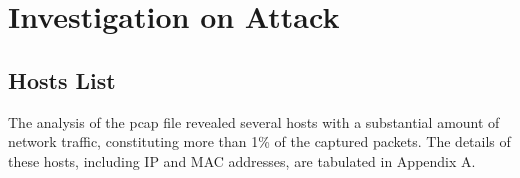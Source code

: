 \documentclass{article}
\begin{document}

    \section{\fontsize{14pt}{17pt}\selectfont Investigation on Attack}\label{sec:selectfont-investigation-on-attack}
    \subsection{Hosts List}\label{subsec:hosts-list}
    The analysis of the pcap file revealed several hosts with a substantial amount of network traffic,
    constituting more than 1\% of the captured packets.
    The details of these hosts, including IP and MAC addresses, are tabulated in Appendix A.
\end{document}
